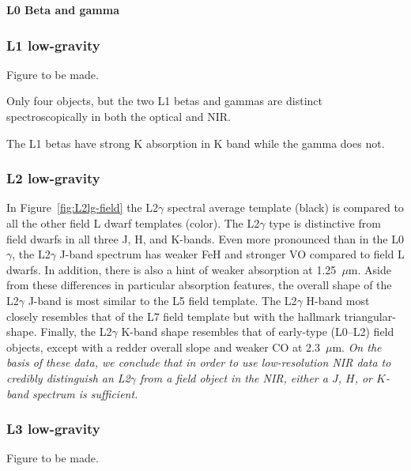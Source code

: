 \documentclass[12pt,preprint]{aastex}
\begin{document}
\textbf{L0 Beta and gamma }

\subsubsection{L1 low-gravity}
Figure to be made.

Only four objects, but the two L1 betas and gammas are distinct spectroscopically in both the optical and NIR.

The L1 betas have strong K absorption in K band while the gamma does not.

\subsubsection{L2 low-gravity}
In Figure~\ref{fig:L2lg-field} the L2$\gamma$ spectral average template (black) is compared to all the other field L dwarf templates (color). 
The L2$\gamma$ type is distinctive from field dwarfs in all three J, H, and K-bands. 
Even more pronounced than in the L0$\gamma$, the L2$\gamma$ J-band spectrum has weaker FeH and stronger VO compared to field L dwarfs. 
In addition, there is also a hint of weaker  absorption at 1.25~$\mu$m. Aside from these differences in particular absorption features, the overall shape of the L2$\gamma$ J-band is most similar to the L5 field template.
The L2$\gamma$ H-band most closely resembles that of the L7 field template but with the hallmark  triangular-shape. 
Finally, the L2$\gamma$ K-band shape resembles that of early-type (L0--L2) field objects, except with a redder overall slope and weaker CO at 2.3~$\mu$m. 
\emph{On the basis of these data, we conclude that in order to use low-resolution NIR data to credibly distinguish an L2$\gamma$ from a field object in the NIR, either a $J$, $H$, or $K$-band spectrum is sufficient.}

\subsubsection{L3 low-gravity}
Figure to be made.
\end{document}
